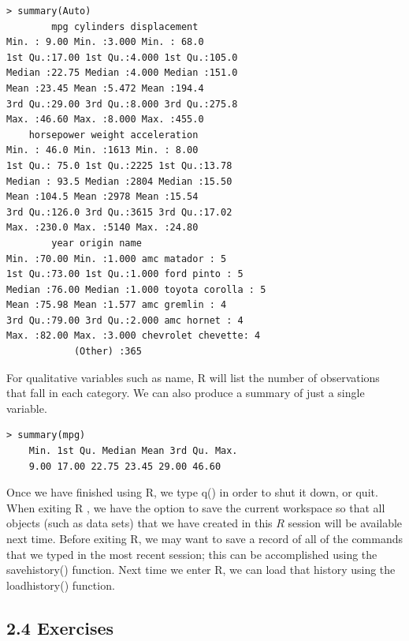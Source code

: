 \documentclass[10pt]{article}
\begin{document}
\begin{verbatim}
> summary(Auto)
        mpg cylinders displacement
Min. : 9.00 Min. :3.000 Min. : 68.0
1st Qu.:17.00 1st Qu.:4.000 1st Qu.:105.0
Median :22.75 Median :4.000 Median :151.0
Mean :23.45 Mean :5.472 Mean :194.4
3rd Qu.:29.00 3rd Qu.:8.000 3rd Qu.:275.8
Max. :46.60 Max. :8.000 Max. :455.0
    horsepower weight acceleration
Min. : 46.0 Min. :1613 Min. : 8.00
1st Qu.: 75.0 1st Qu.:2225 1st Qu.:13.78
Median : 93.5 Median :2804 Median :15.50
Mean :104.5 Mean :2978 Mean :15.54
3rd Qu.:126.0 3rd Qu.:3615 3rd Qu.:17.02
Max. :230.0 Max. :5140 Max. :24.80
        year origin name
Min. :70.00 Min. :1.000 amc matador : 5
1st Qu.:73.00 1st Qu.:1.000 ford pinto : 5
Median :76.00 Median :1.000 toyota corolla : 5
Mean :75.98 Mean :1.577 amc gremlin : 4
3rd Qu.:79.00 3rd Qu.:2.000 amc hornet : 4
Max. :82.00 Max. :3.000 chevrolet chevette: 4
            (Other) :365
\end{verbatim}

For qualitative variables such as name, R will list the number of observations that fall in each category. We can also produce a summary of just a single variable.

\begin{verbatim}
> summary(mpg)
    Min. 1st Qu. Median Mean 3rd Qu. Max.
    9.00 17.00 22.75 23.45 29.00 46.60
\end{verbatim}

Once we have finished using R, we type q() in order to shut it down, or quit. When exiting R , we have the option to save the current workspace so that all objects (such as data sets) that we have created in this $R$ session will be available next time. Before exiting R, we may want to save a record of all of the commands that we typed in the most recent session; this can be accomplished using the savehistory() function. Next time we enter R, we can load that history using the loadhistory() function.

\subsection*{2.4 Exercises}
\end{document}
